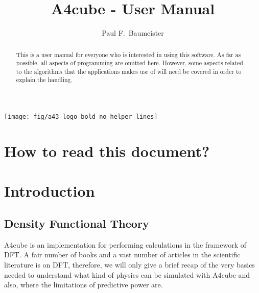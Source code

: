 \documentclass[oribibl]{llncs}
\newcommand{\codename}{A4cube}
\begin{document}
\pagestyle{plain}

\title       {\codename{} - User Manual}
\titlerunning{\codename{}}

\author{%
  Paul F.~Baumeister %
}


\maketitle

\begin{figure*}
	\centering
	\texttt{[image: fig/a43\_logo\_bold\_no\_helper\_lines]} %
\end{figure*}

\begin{abstract}
This is a user manual for everyone who is interested in using
this software.
As far as possible, all aspects of programming are omitted here.
However, some aspects related to the algorithms that the applications 
makes use of will need be covered in order to explain the handling.
\end{abstract}

\section*{How to read this document?}

\newpage
\section{Introduction} \label{sec:intro}
%
\subsection{Density Functional Theory}
\codename{} is an implementation for performing calculations in the framework of \ac{DFT}.
A fair number of books and a vast number of articles in the scientific 
literature is on \ac{DFT}, therefore, we will only give a brief recap 
of the very basics needed to understand what kind of physics can be
simulated with \codename{} and also, where the limitations of predictive power
are.
\end{document}
